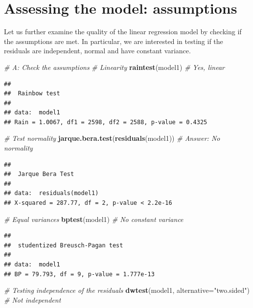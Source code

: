 \documentclass[12pt,]{article}
\newenvironment{Shaded}{\begin{snugshade}}{\end{snugshade}}
\newcommand{\KeywordTok}[1]{\textcolor[rgb]{0.13,0.29,0.53}{\textbf{{#1}}}}
\newcommand{\DataTypeTok}[1]{\textcolor[rgb]{0.13,0.29,0.53}{{#1}}}
\newcommand{\StringTok}[1]{\textcolor[rgb]{0.31,0.60,0.02}{{#1}}}
\newcommand{\CommentTok}[1]{\textcolor[rgb]{0.56,0.35,0.01}{\textit{{#1}}}}
\newcommand{\NormalTok}[1]{{#1}}
\begin{document}
\section{Assessing the model:
assumptions}\label{assessing-the-model-assumptions}

Let us further examine the quality of the linear regression model by
checking if the assumptions are met. In particular, we are interested in
testing if the residuals are independent, normal and have constant
variance.

\begin{Shaded}
\begin{Highlighting}[]
\CommentTok{# A: Check the assumptions}
\CommentTok{# Linearity}
\KeywordTok{raintest}\NormalTok{(model1) }\CommentTok{# Yes, linear}
\end{Highlighting}
\end{Shaded}

\begin{verbatim}
## 
##  Rainbow test
## 
## data:  model1
## Rain = 1.0067, df1 = 2598, df2 = 2588, p-value = 0.4325
\end{verbatim}

\begin{Shaded}
\begin{Highlighting}[]
\CommentTok{# Test normality}
\KeywordTok{jarque.bera.test}\NormalTok{(}\KeywordTok{residuals}\NormalTok{(model1)) }\CommentTok{# Answer: No normality}
\end{Highlighting}
\end{Shaded}

\begin{verbatim}
## 
##  Jarque Bera Test
## 
## data:  residuals(model1)
## X-squared = 287.77, df = 2, p-value < 2.2e-16
\end{verbatim}

\begin{Shaded}
\begin{Highlighting}[]
\CommentTok{# Equal variances}
\KeywordTok{bptest}\NormalTok{(model1) }\CommentTok{# No constant variance}
\end{Highlighting}
\end{Shaded}

\begin{verbatim}
## 
##  studentized Breusch-Pagan test
## 
## data:  model1
## BP = 79.793, df = 9, p-value = 1.777e-13
\end{verbatim}

\begin{Shaded}
\begin{Highlighting}[]
\CommentTok{# Testing independence of the residuals}
\KeywordTok{dwtest}\NormalTok{(model1, }\DataTypeTok{alternative=}\StringTok{"two.sided"}\NormalTok{) }\CommentTok{# Not independent}
\end{Highlighting}
\end{Shaded}
\end{document}
